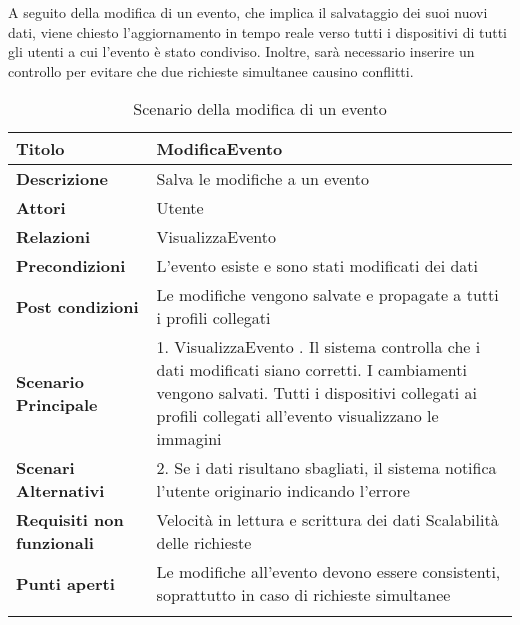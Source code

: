 A seguito della modifica di un evento, 
che implica il salvataggio dei suoi nuovi dati, 
viene chiesto l'aggiornamento in tempo reale verso 
tutti i dispositivi di tutti gli utenti a cui l'evento è stato condiviso.
Inoltre, sarà necessario inserire un controllo per evitare 
che due richieste simultanee causino conflitti.\\

\begin{longtable} {|P{4.5cm}|P{11cm}|}
        \hline
        \textbf{Titolo}                   & ModificaEvento                                                                                 \\
        \hline
        \textbf{Descrizione}              & Salva le modifiche a un evento                                                                \\
        \hline
        \textbf{Attori}                   & Utente                                                                                         \\
        \hline
        \textbf{Relazioni}                & VisualizzaEvento                                                                               \\
        \hline
        \textbf{Precondizioni}            & L'evento esiste e sono stati modificati dei dati                                               \\
        \hline
        \textbf{Post condizioni}           & Le modifiche vengono salvate e propagate a tutti i profili collegati                           \\
        \hline
        \textbf{Scenario Principale}      & 1. VisualizzaEvento . Il sistema controlla che i dati modificati siano corretti. I cambiamenti vengono salvati. Tutti i dispositivi collegati ai profili collegati all'evento visualizzano le immagini                                          \\
        \hline
        \textbf{Scenari Alternativi}      & 2. Se i dati risultano sbagliati, il sistema notifica l'utente originario indicando l'errore   \\
        \hline
        \textbf{Requisiti non funzionali} & Velocità in lettura e scrittura dei dati \newline
        Scalabilità delle richieste                                                                                                        \\
        \hline
        \textbf{Punti aperti}             & Le modifiche all'evento devono essere consistenti, \newline 
        soprattutto in caso di richieste simultanee \\
        \hline
    \caption{Scenario della modifica di un evento}
\end{longtable}

